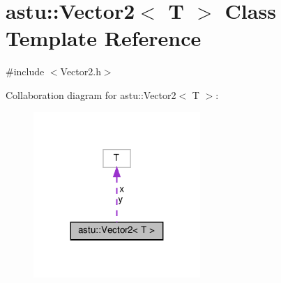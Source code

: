 \hypertarget{classastu_1_1Vector2}{}\section{astu\+:\+:Vector2$<$ T $>$ Class Template Reference}
\label{classastu_1_1Vector2}


{\ttfamily \#include $<$Vector2.\+h$>$}



Collaboration diagram for astu\+:\+:Vector2$<$ T $>$\+:\nopagebreak
\begin{figure}[H]
\begin{center}
\leavevmode
\includegraphics[width=179pt]{classastu_1_1Vector2__coll__graph}
\end{center}
\end{figure}

